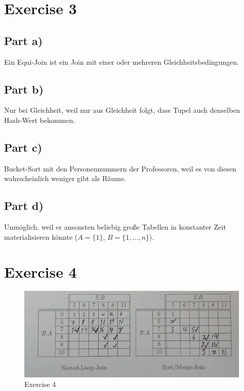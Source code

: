 \documentclass[10pt,a4paper]{article}
\begin{document}
\section*{Exercise 3}

\subsection*{Part a)}

Ein Equi-Join ist ein Join mit einer oder mehreren Gleichheitsbedingungen.

\subsection*{Part b)}

Nur bei Gleichheit, weil nur aus Gleichheit folgt, dass Tupel auch denselben Hash-Wert bekommen.

\subsection*{Part c)}

Bucket-Sort mit den Personennummern der Professoren, weil es von diesen wahrscheinlich weniger gibt als Räume.

\subsection*{Part d)}

Unmöglich, weil er ansonsten beliebig große Tabellen in konstanter Zeit materialisieren könnte ($A = \{ 1 \}$, $B = \{ 1, \dots, n \}$).

\section*{Exercise 4}

\begin{figure}[h]
  \centering
  \includegraphics[width=\textwidth]{sheet-12/exercise-4}
  \caption{Exercise 4}
\end{figure}
\end{document}
